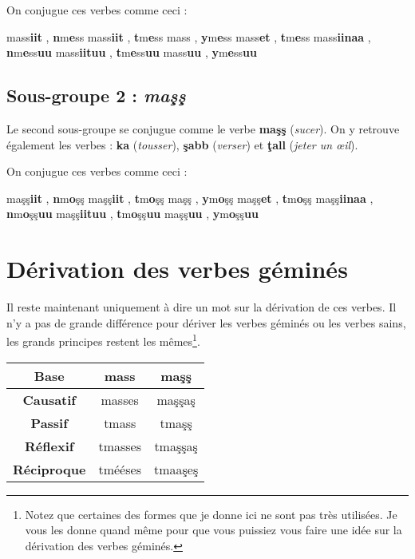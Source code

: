 On conjugue ces verbes comme ceci : 

     {mass\textbf{iit} , \textbf{n}m\textbf{e}ss}
     {mass\textbf{iit} , \textbf{t}m\textbf{e}ss}
     {mass , \textbf{y}m\textbf{e}ss}
     {mass\textbf{et} , \textbf{t}m\textbf{e}ss}
     {mass\textbf{iinaa} , \textbf{n}m\textbf{e}ss\textbf{uu}}
     {mass\textbf{iituu} , \textbf{t}m\textbf{e}ss\textbf{uu}}
     {mass\textbf{uu} , \textbf{y}m\textbf{e}ss\textbf{uu}}

\subsection{Sous-groupe 2 : \textit{ma\c{s}\c{s}}}
Le second sous-groupe se conjugue comme le verbe \textbf{ma\c{s}\c{s}} (\textit{sucer}). On y retrouve également les verbes : \textbf{ka\textcrh\textcrh} (\textit{tousser}), \textbf{\c{s}abb} (\textit{verser}) et \textbf{\c{t}all} (\textit{jeter un \oe il}).

On conjugue ces verbes comme ceci :

    {ma\c{s}\c{s}\textbf{iit} , \textbf{n}m\textbf{o}\c{s}\c{s}}
    {ma\c{s}\c{s}\textbf{iit} , \textbf{t}m\textbf{o}\c{s}\c{s}}
    {ma\c{s}\c{s} , \textbf{y}m\textbf{o}\c{s}\c{s}}
    {ma\c{s}\c{s}\textbf{et} , \textbf{t}m\textbf{o}\c{s}\c{s}}
    {ma\c{s}\c{s}\textbf{iinaa} , \textbf{n}m\textbf{o}\c{s}\c{s}\textbf{uu}}
    {ma\c{s}\c{s}\textbf{iituu} , \textbf{t}m\textbf{o}\c{s}\c{s}\textbf{uu}}
    {ma\c{s}\c{s}\textbf{uu} , \textbf{y}m\textbf{o}\c{s}\c{s}\textbf{uu}}

\section{Dérivation des verbes géminés}
Il reste maintenant uniquement à dire un mot sur la dérivation de ces verbes. Il n'y a pas de grande différence pour dériver les verbes géminés ou les verbes sains, les grands principes restent les mêmes\footnote{Notez que certaines des formes que je donne ici ne sont pas très utilisées. Je vous les donne quand même pour que vous puissiez vous faire une idée sur la dérivation des verbes géminés.}. 

\begin{center}
    \begin{tabular}{||c | c | c||}
     \hline
     \textbf{Base} & \textbf{mass} & \textbf{ma\c{s}\c{s}} \\
     \hline\hline
     \textbf{Causatif} & masses & ma\c{s}\c{s}a\c{s} \\
    \hline
    \textbf{Passif} & tmass & tma\c{s}\c{s} \\
   \hline
   \textbf{Réflexif} & tmasses & tma\c{s}\c{s}a\c{s} \\
  \hline
  \textbf{Réciproque} & tmééses & tmaa\c{s}e\c{s} \\
 \hline
    \end{tabular}
\end{center}

